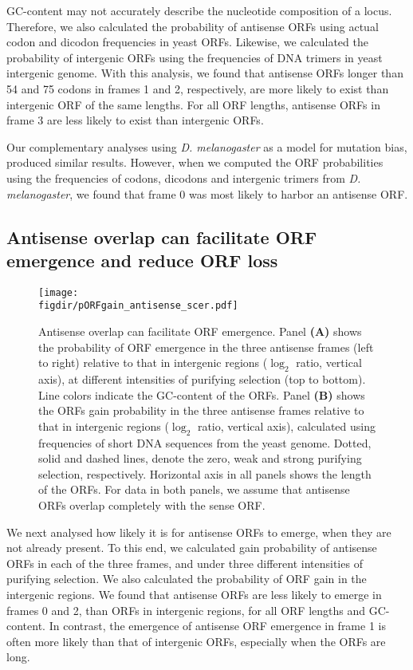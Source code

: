 \documentclass[12pt,a4paper]{article}
\begin{document}
GC-content may not accurately describe the nucleotide composition of a locus. Therefore, we also calculated the probability of antisense ORFs using actual codon and dicodon frequencies in yeast ORFs. Likewise, we calculated the probability of intergenic ORFs using the frequencies of DNA trimers in yeast intergenic genome. With this analysis, we found that antisense ORFs longer than 54 and 75 codons in frames 1 and 2, respectively, are more likely to exist than intergenic ORF of the same lengths. For all ORF lengths, antisense ORFs in frame 3 are less likely to exist than intergenic ORFs. 

Our complementary analyses using \textit{D. melanogaster} as a model for mutation bias, produced similar results. However, when we computed the ORF probabilities using the frequencies of codons, dicodons and intergenic trimers from  \textit{D. melanogaster}, we found that frame 0 was most likely to harbor an antisense ORF. 

\subsection*{Antisense overlap can facilitate ORF emergence and reduce ORF loss}

\begin{figure}[!b]
\centering
\texttt{[image: \\figdir/pORFgain\_antisense\_scer.pdf]}
\caption{Antisense overlap can facilitate ORF emergence. Panel \textbf{(A)} shows the probability of ORF emergence in the three antisense frames (left to right) relative to that in intergenic regions ($\log_2$ ratio, vertical axis), at different intensities of purifying selection (top to bottom). Line colors indicate the GC-content of the ORFs. Panel \textbf{(B)} shows the ORFs gain probability in the three antisense frames relative to that in intergenic regions ($\log_2$ ratio, vertical axis), calculated using frequencies of short DNA sequences from the yeast genome. Dotted, solid and dashed lines, denote the zero, weak and strong purifying selection, respectively. Horizontal axis in all panels shows the length of the ORFs. For data in both panels, we assume that antisense ORFs overlap completely with the sense ORF.}
\label{pORFgain}
\end{figure}

We next analysed how likely it is for antisense ORFs to emerge, when they are not already present. To this end, we calculated gain probability of antisense ORFs in each of the three frames, and under three different intensities of purifying selection. We also calculated the probability of ORF gain in the intergenic regions. We found that antisense ORFs are less likely to emerge in frames 0 and 2, than ORFs in intergenic regions, for all ORF lengths and GC-content. In contrast, the emergence of antisense ORF emergence in frame 1 is often more likely than that of intergenic ORFs, especially when the ORFs are long. 
\end{document}
